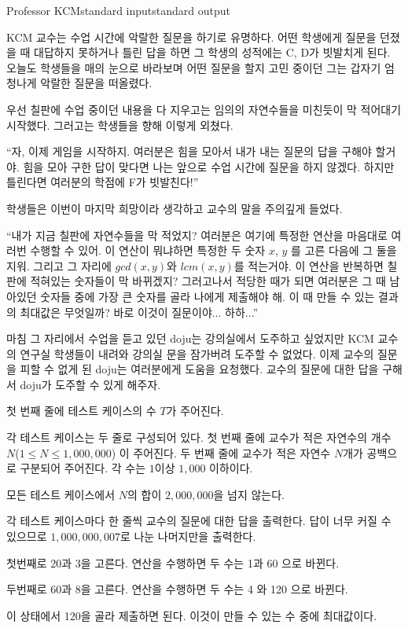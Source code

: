 \begin{problem}{Professor KCM}{standard input}{standard output}

KCM 교수는 수업 시간에 악랄한 질문을 하기로 유명하다. 어떤 학생에게 질문을 던졌을 때 대답하지 못하거나 틀린 답을 하면 그 학생의 성적에는 C, D가 빗발치게 된다. 오늘도 학생들을 매의 눈으로 바라보며 어떤 질문을 할지 고민 중이던 그는 갑자기 엄청나게 악랄한 질문을 떠올렸다.

우선 칠판에 수업 중이던 내용을 다 지우고는 임의의 자연수들을 미친듯이 막 적어대기 시작했다. 그러고는 학생들을 향해 이렇게 외쳤다.

``자, 이제 게임을 시작하지. 여러분은 힘을 모아서 내가 내는 질문의 답을 구해야 할거야. 힘을 모아 구한 답이 맞다면 나는 앞으로 수업 시간에 질문을 하지 않겠다. 하지만 틀린다면 여러분의 학점에 F가 빗발친다!''

학생들은 이번이 마지막 희망이라 생각하고 교수의 말을 주의깊게 들었다.

``내가 지금 칠판에 자연수들을 막 적었지? 여러분은 여기에 특정한 연산을 마음대로 여러번 수행할 수 있어. 이 연산이 뭐냐하면 특정한 두 숫자 $x$, $y$ 를 고른 다음에 그 둘을 지워. 그리고 그 자리에 $gcd(x, y)$와 $lcm(x, y)$를 적는거야. 이 연산을 반복하면 칠판에 적혀있는 숫자들이 막 바뀌겠지? 그러고나서 적당한 때가 되면 여러분은 그 때 남아있던 숫자들 중에 가장 큰 숫자를 골라 나에게 제출해야 해. 이 때 만들 수 있는 결과의 최대값은 무엇일까? 바로 이것이 질문이야... 하하...''

마침 그 자리에서 수업을 듣고 있던 doju는 강의실에서 도주하고 싶었지만 KCM 교수의 연구실 학생들이 내려와 강의실 문을 잠가버려 도주할 수 없었다. 이제 교수의 질문을 피할 수 없게 된 doju는 여러분에게 도움을 요청했다. 교수의 질문에 대한 답을 구해서 doju가 도주할 수 있게 해주자.

\InputFile
첫 번째 줄에 테스트 케이스의 수 $T$가 주어진다.

각 테스트 케이스는 두 줄로 구성되어 있다. 첫 번째 줄에 교수가 적은 자연수의 개수 $N$($1 \le N \le 1,000,000$) 이 주어진다. 두 번째 줄에 교수가 적은 자연수 $N$개가 공백으로 구분되어 주어진다. 각 수는 $1$이상 $1,000$ 이하이다.

모든 테스트 케이스에서 $N$의 합이 $2,000,000$을 넘지 않는다.

\OutputFile
각 테스트 케이스마다 한 줄씩 교수의 질문에 대한 답을 출력한다. 답이 너무 커질 수 있으므로 $1,000,000,007$로 나눈 나머지만을 출력한다.

\Example

\begin{example}
%
\end{example}

\Notes

첫번째로 20과 3을 고른다. 연산을 수행하면 두 수는 1과 60 으로 바뀐다.

두번째로 60과 8을 고른다. 연산을 수행하면 두 수는 4 와 120 으로 바뀐다.

이 상태에서 120을 골라 제출하면 된다. 이것이 만들 수 있는 수 중에 최대값이다.

\end{problem}
